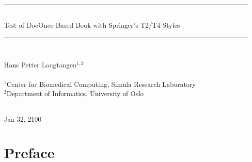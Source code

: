 \documentclass[graybox,sectrefs,envcountresetchap,open=right,final]{svmonodo}
\begin{document}

\newcommand{\exercisesection}[1]{\subsection*{#1}}






\frontmatter
\setcounter{page}{3}
\pagestyle{headings}



\thispagestyle{empty}
\hbox{\ \ }
\vfill
\begin{center}
{\huge{\bfseries{
\begin{spacing}{1.25}
{\rule{\linewidth}{0.5mm}} \\[0.4cm]
{Test of DocOnce-Based Book with Springer's T2/T4 Styles}
\\[0.4cm] {\rule{\linewidth}{0.5mm}} \\[1.5cm]
\end{spacing}
}}}


\vspace{0.5cm}

{\Large\textsf{Hans Petter Langtangen${}^{1, 2}$}}\\ [3mm]

\ \\ [2mm]

{\large\textsf{${}^1$Center for Biomedical Computing, Simula Research Laboratory} \\ [1.5mm]}
{\large\textsf{${}^2$Department of Informatics, University of Oslo} \\ [1.5mm]}

\ \\ [10mm]
{\large\textsf{Jan 32, 2100}}
\end{center}
\vfill
\clearpage

\setpagesize

\chapter*{Preface}
\end{document}
